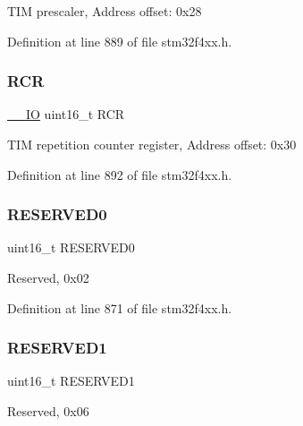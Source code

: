 T\+IM prescaler, Address offset\+: 0x28 

Definition at line 889 of file stm32f4xx.\+h.

\mbox{\label{struct_t_i_m___type_def_aa0663aab6ed640b7594c8c6d32f6c1cd}} 
\subsubsection{\texorpdfstring{R\+CR}{RCR}}
{\footnotesize\ttfamily \hyperlink{group___c_m_s_i_s__core__definitions_gaec43007d9998a0a0e01faede4133d6be}{\+\_\+\+\_\+\+IO} uint16\+\_\+t R\+CR}

T\+IM repetition counter register, Address offset\+: 0x30 

Definition at line 892 of file stm32f4xx.\+h.

\mbox{\label{struct_t_i_m___type_def_a149feba01f9c4a49570c6d88619f504f}} 
\subsubsection{\texorpdfstring{R\+E\+S\+E\+R\+V\+E\+D0}{RESERVED0}}
{\footnotesize\ttfamily uint16\+\_\+t R\+E\+S\+E\+R\+V\+E\+D0}

Reserved, 0x02 

Definition at line 871 of file stm32f4xx.\+h.

\mbox{\label{struct_t_i_m___type_def_a8249a3955aace28d92109b391311eb30}} 
\subsubsection{\texorpdfstring{R\+E\+S\+E\+R\+V\+E\+D1}{RESERVED1}}
{\footnotesize\ttfamily uint16\+\_\+t R\+E\+S\+E\+R\+V\+E\+D1}

Reserved, 0x06 

